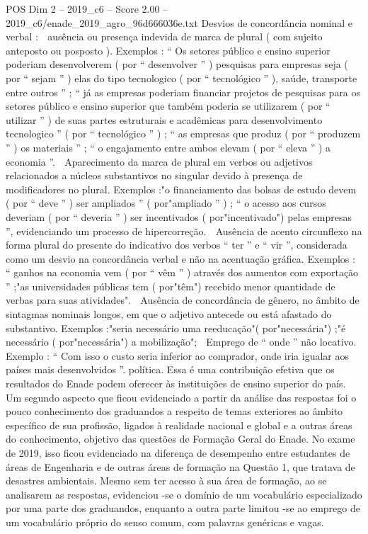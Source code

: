 \begin{textsample}{POS Dim 2 – 2019\_c6 – Score 2.00 – 2019\_c6/enade\_2019\_agro\_96d666036e.txt}
Desvios de concordância nominal e verbal :  ausência ou presença indevida de marca de plural ( com sujeito anteposto ou posposto ).
Exemplos : “ Os setores público e ensino superior poderiam desenvolverem ( por “ desenvolver ” ) pesquisas para empresas seja ( por “ sejam ” ) elas do tipo tecnologico ( por “ tecnológico ” ), saúde, transporte entre outros ” ; “ já as empresas poderiam financiar projetos de pesquisas para os setores público e ensino superior que também poderia se utilizarem ( por “ utilizar ” ) de suas partes estruturais e acadêmicas para desenvolvimento tecnologico ” ( por “ tecnológico ” ) ; “ as empresas que produz ( por “ produzem ” ) os materiais ” ; “ o engajamento entre ambos elevam ( por “ eleva ” ) a economia ”.  Aparecimento da marca de plural em verbos ou adjetivos relacionados a núcleos substantivos no singular devido à presença de modificadores no plural.
Exemplos :"o financiamento das bolsas de estudo devem ( por “ deve ” ) ser ampliados ” ( por"ampliado ” ) ; “ o acesso aos cursos deveriam ( por “ deveria ” ) ser incentivados ( por"incentivado") pelas empresas ”, evidenciando um processo de hipercorreção.  Ausência de acento circunflexo na forma plural do presente do indicativo dos verbos “ ter ” e “ vir ”, considerada como um desvio na concordância verbal e não na acentuação gráfica.
Exemplos : “ ganhos na economia vem ( por “ vêm ” ) através dos aumentos com exportação ” ;"as universidades públicas tem ( por"têm") recebido menor quantidade de verbas para suas atividades".  Ausência de concordância de gênero, no âmbito de sintagmas nominais longos, em que o adjetivo antecede ou está afastado do substantivo.
Exemplos :"seria necessário uma reeducação"( por"necessária") ;"é necessário ( por"necessária") a mobilização";  Emprego de “ onde ” não locativo.
Exemplo : “ Com isso o custo seria inferior ao comprador, onde iria igualar aos países mais desenvolvidos ”. política.
Essa é uma contribuição efetiva que os resultados do Enade podem oferecer às instituições de ensino superior do país.
Um segundo aspecto que ficou evidenciado a partir da análise das respostas foi o pouco conhecimento dos graduandos a respeito de temas exteriores ao âmbito específico de sua profissão, ligados à realidade nacional e global e a outras áreas do conhecimento, objetivo das questões de Formação Geral do Enade.
No exame de 2019, isso ficou evidenciado na diferença de desempenho entre estudantes de áreas de Engenharia e de outras áreas de formação na Questão 1, que tratava de desastres ambientais.
Mesmo sem ter acesso à sua área de formação, ao se analisarem as respostas, evidenciou -se o domínio de um vocabulário especializado por uma parte dos graduandos, enquanto a outra parte limitou -se ao emprego de um vocabulário próprio do senso comum, com palavras genéricas e vagas.

\end{textsample}
